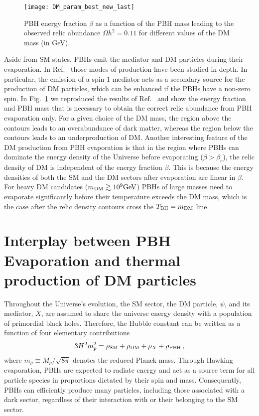 \documentclass[aps,prd,reprint,twocolumn,preprintnumbers,floatfix,nofootinbib]{revtex4-1}
\newcommand{\be}{\begin{equation}}
\newcommand{\ee}{\end{equation}}
\newcommand{\TBH}{T_{\rm BH}}
\begin{document}
\begin{figure}[t!]
 \texttt{[image: DM\_param\_best\_new\_last]}
 \caption{PBH energy fraction $\beta$ as a function of the PBH mass leading to the observed relic abundance $\Omega h^2=0.11$ for different values of the DM mass (in GeV).}\label{fig:DM_PBH}
\end{figure}
Aside from SM states, PBHs emit the mediator and DM particles during their evaporation. In Ref.~\cite{paper1} those modes of production have been studied in depth. In particular, the emission of a spin-1 mediator acts as a secondary source for the production of DM particles, which can be enhanced if the PBHs have a non-zero spin. In Fig.~\ref{fig:DM_PBH} we reproduced the results of Ref.~\cite{paper1} and show the energy fraction and PBH mass that is necessary to obtain the correct relic abundance from PBH evaporation only. For a given choice of the DM mass, the region above the contours leads to an overabundance of dark matter, whereas the region below the contours leads to an underproduction of DM. Another interesting feature of the DM production from PBH evaporation is that in the region where PBHs can dominate the energy density of the Universe before evaporating ($\beta>\beta_c$), the relic density of DM is independent of the energy fraction $\beta$. This is because the energy densities of both the SM and the DM sectors after evaporation are linear in $\beta$. For heavy DM candidates ($m_{\rm DM} \gtrsim 10^9\mathrm{GeV}$) PBHs of large masses need to evaporate significantly before their temperature exceeds the DM mass, which is the case after the relic density contours cross the $\TBH=m_{\rm DM}$ line.



\section{Interplay between PBH Evaporation and thermal production of DM particles}\label{sec:interplay}

Throughout the Universe's evolution, the SM sector, the DM particle, $\psi$, and its mediator, $X$, are assumed to share the universe energy density with a population of primordial black holes. Therefore, the Hubble constant can be written as a function of four elementary contributions
\be\label{eq:Hubble}
3H^2m_p^2=\rho_{\rm SM} + \rho_{\rm DM} + \rho_X + \rho_{\rm PBH}\,,
\ee
where $m_p\equiv M_p/\sqrt{8\pi}$ denotes the reduced Planck mass. Through Hawking evaporation, PBHs are expected to radiate energy and act as a source term for all particle species in proportions dictated by their spin and mass. Consequently, PBHs can efficiently produce many particles, including those associated with a dark sector, regardless of their interaction with or their belonging to the SM sector. 
\end{document}
